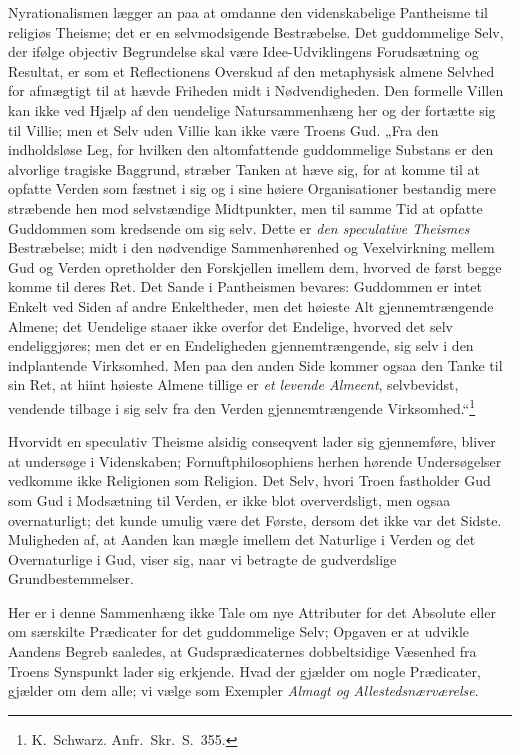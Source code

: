 \documentclass[12pt]{book}
\begin{document}
Nyrationalismen lægger an paa at omdanne den videnskabelige
Pantheisme til religiøs Theisme; det er en selvmodsigende
Bestræbelse. Det guddommelige Selv, der
ifølge objectiv Begrundelse skal være Idee-Udviklingens Forudsætning
og Resultat, er som et Reflectionens Overskud af den metaphysisk
almene Selvhed for afmægtigt til at hævde Friheden midt i
Nødvendigheden. Den formelle Villen kan ikke ved Hjælp af den
uendelige Natursammenhæng her og der fortætte sig til Villie; men et
Selv uden Villie kan ikke være Troens Gud. „Fra den indholdsløse
Leg, for hvilken den altomfattende guddommelige Substans er den
alvorlige tragiske Baggrund, stræber Tanken at hæve sig, for at
komme til at opfatte Verden som fæstnet i sig og i sine høiere
Organisationer bestandig mere stræbende hen mod selvstændige
Midtpunkter, men til samme Tid at opfatte Guddommen som kredsende om
sig selv. Dette er \emph{den speculative Theismes} Bestræbelse; midt
i den nødvendige Sammenhørenhed og Vexelvirkning mellem Gud og
Verden opretholder den Forskjellen imellem dem, hvorved de først
begge komme til deres Ret. Det Sande i Pantheismen bevares:
Guddommen er intet Enkelt ved Siden af andre Enkeltheder, men det
høieste Alt gjennemtrængende Almene; det Uendelige staaer ikke
overfor det Endelige, hvorved det selv endeliggjøres; men det er en
Endeligheden gjennemtrængende, sig selv i den indplantende
Virksomhed. Men paa den anden Side kommer ogsaa den Tanke til sin
Ret, at hiint høieste Almene tillige er \emph{et levende Almeent},
selvbevidst, vendende tilbage i sig selv fra den Verden
gjennemtrængende Virksomhed.“\footnote{K.\ Schwarz. Anfr.\ Skr.\
S.\ 355.}

Hvorvidt en speculativ Theisme alsidig conseqvent lader sig
gjennemføre, bliver at undersøge i Videnskaben; Fornuftphilosophiens
herhen hørende Undersøgelser vedkomme ikke Religionen som Religion.
Det Selv, hvori Troen fastholder Gud som Gud i Modsætning til
Verden, er ikke blot oververdsligt, men ogsaa overnaturligt; det
kunde umulig være det Første, dersom det ikke var det Sidste.
Muligheden af, at Aanden kan mægle imellem det Naturlige i Verden og
det Overnaturlige i Gud, viser sig, naar vi betragte de gudverdslige
Grundbestemmelser.

Her er i denne Sammenhæng ikke Tale om nye Attributer for det
Absolute eller om særskilte Prædicater for det guddommelige Selv;
Opgaven er at udvikle Aandens Begreb saaledes, at Gudsprædicaternes
dobbeltsidige Væsenhed fra Troens Synspunkt lader sig erkjende. Hvad
der gjælder om nogle Prædicater, gjælder om dem alle; vi vælge som
Exempler \emph{Almagt og Allestedsnærværelse}.
\end{document}
